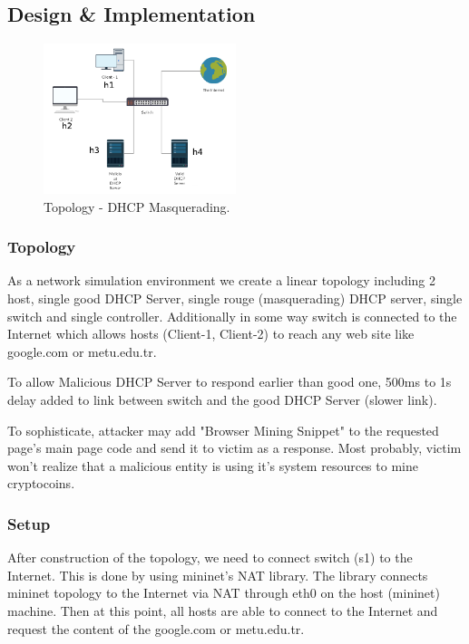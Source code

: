 \documentclass[conference,compsoc]{IEEEtran}
\begin{document}
\subsection{Design \& Implementation}

\begin{figure}[H]
\centering
\includegraphics[width=0.5\textwidth]{dhcp_schema.png}
\caption{\label{fig:diagram_2}Topology - DHCP Masquerading.}
\end{figure}

\subsubsection{Topology}
As a network simulation environment we create a linear topology including 2 host, single good DHCP Server, single rouge (masquerading) DHCP server, single switch and single controller. Additionally in some way switch is connected to the Internet which allows hosts (Client-1, Client-2) to reach any web site like google.com or metu.edu.tr.  

To allow Malicious DHCP Server to respond earlier than good one, 500ms to 1s delay added to link between switch and the good DHCP Server (slower link). 

To sophisticate, attacker may add "Browser Mining Snippet" to the requested page's main page code and send it to victim as a response. Most probably, victim won't realize that a malicious entity is using it's system resources to mine cryptocoins.

\subsubsection{Setup}

After construction of the topology, we need to connect switch (s1) to the Internet. This is done by using mininet's NAT library. The library connects mininet topology to the Internet via NAT through eth0 on the host (mininet) machine. Then at this point, all hosts are able to connect to the Internet and request the content of the google.com or metu.edu.tr. 
\end{document}
